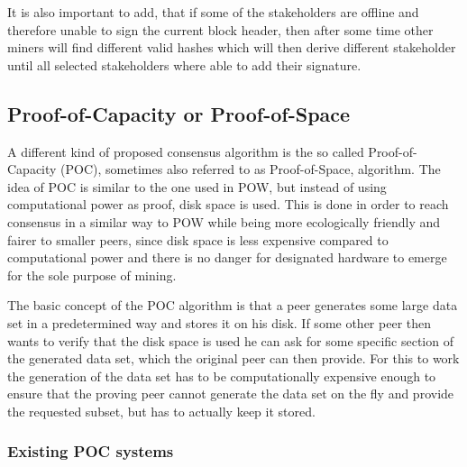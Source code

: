 It is also important to add, that if some of the stakeholders are offline and therefore unable to sign the current block header, then after some time other miners will find different valid hashes
which will then derive different stakeholder until all selected stakeholders where able to add their signature.\cite{url:poa}

\subsection{Proof-of-Capacity or Proof-of-Space}

\label{proof-of-space}

A different kind of proposed consensus algorithm is the so called Proof-of-Capacity (POC), sometimes also referred to as Proof-of-Space, algorithm. The idea of POC is similar to the one used in POW, but
instead of using computational power as proof, disk space is used. This is done in order to reach consensus in a similar way to POW while being more ecologically friendly and
fairer to smaller peers, since disk space is less expensive compared to computational power and there is no danger for designated hardware to emerge for the sole purpose of mining.\par
The basic concept of the POC algorithm is that a peer generates some large data set in a predetermined way and stores it on his disk. If some other peer then wants to verify that the disk space is used
he can ask for some specific section of the generated data set, which the original peer can then provide. For this to work the generation of the data set has to be computationally expensive enough
to ensure that the proving peer cannot generate the data set on the fly and provide the requested subset, but has to actually keep it stored.\cite{url:poc}

\subsubsection{Existing POC systems}

